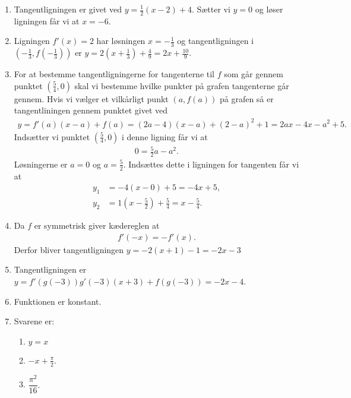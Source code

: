 \begin{enumerate}
	
	\item Tangentligningen er givet ved $y=\frac{1}{2}(x-2)+4$. Sætter vi $y=0$ og løser ligningen får vi at $x=-6$.
	
	\item Ligningen $f'(x)=2$ har løsningen $x=-\frac{1}{3}$ og tangentligningen i $ (-\frac{1}{3},f(-\frac{1}{3})) $ er $ y=2(x+\frac{1}{3}) +\frac{4}{9}=2x+\frac{10}{9}$.
	
	
	\item For at bestemme tangentligningerne for tangenterne til $f$ som går gennem punktet $(\frac{5}{4},0)$ skal vi bestemme hvilke punkter på grafen tangenterne går gennem. Hvis vi vælger et vilkårligt punkt $ (a,f(a)) $ på grafen så er tangentliningen gennem punktet givet ved
	\begin{align*}
	y=f'(a)(x-a)+f(a)=(2a-4)(x-a)+(2-a)^2+1=2ax-4x-a^2+5.
	\end{align*}
	Indsætter vi punktet $(\frac{5}{4},0)$ i denne ligning får vi at
	\begin{align*}
	0=\frac{5}{2}a-a^2.
	\end{align*}
	Løsningerne er $a=0$ og $a=\frac{5}{2}$. Indsættes dette i ligningen for tangenten får vi at
	\begin{align*}
	y_1&=-4(x-0)+5=-4x+5,\\
	y_2&=1(x-\frac{5}{2}) +\frac{5}{4}=x-\frac{5}{4}.
	\end{align*}
	
	
	\item Da $f$ er symmetrisk giver kædereglen at
	\begin{align*}
	f'(-x)=-f'(x).
	\end{align*}
	Derfor bliver tangentligningen $y= -2(x+1)-1=-2x-3$
	
	\item Tangentligningen er $y=f'(g(-3))g'(-3)(x+3)+f(g(-3))=-2x-4$.
	
	\item Funktionen er konstant.
	
	\item Svarene er:
	\begin{enumerate}
		\item $y=x$
		\item $-x+\frac{\pi}{2}$.
		\item $\dfrac{\pi^2}{16}$.
	\end{enumerate}


\end{enumerate}